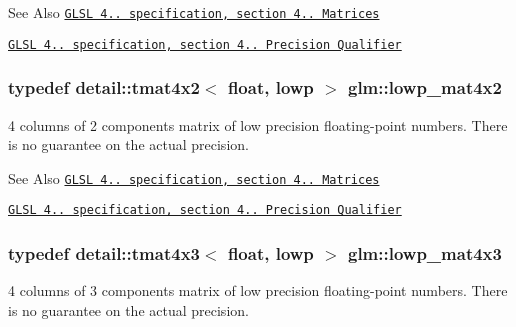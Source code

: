 \begin{DoxySeeAlso}{See Also}
\href{http://www.opengl.org/registry/doc/GLSLangSpec.4.20.8.pdf}{\tt G\-L\-S\-L 4.. specification, section 4.. Matrices} 

\href{http://www.opengl.org/registry/doc/GLSLangSpec.4.20.8.pdf}{\tt G\-L\-S\-L 4.. specification, section 4.. Precision Qualifier} 
\end{DoxySeeAlso}
\hypertarget{group__core__precision_ga2cfe24ae14da17f3510acfc3d03e05a5}{
\subsubsection[{lowp\-\_\-mat4x2}]{\setlength{\rightskip}{0pt plus 5cm}typedef detail\-::tmat4x2$<$ float, lowp $>$ {\bf glm\-::lowp\-\_\-mat4x2}}}\label{group__core__precision_ga2cfe24ae14da17f3510acfc3d03e05a5}
4 columns of 2 components matrix of low precision floating-\/point numbers. There is no guarantee on the actual precision.

\begin{DoxySeeAlso}{See Also}
\href{http://www.opengl.org/registry/doc/GLSLangSpec.4.20.8.pdf}{\tt G\-L\-S\-L 4.. specification, section 4.. Matrices} 

\href{http://www.opengl.org/registry/doc/GLSLangSpec.4.20.8.pdf}{\tt G\-L\-S\-L 4.. specification, section 4.. Precision Qualifier} 
\end{DoxySeeAlso}
\hypertarget{group__core__precision_gada92d0baf15002240dd6f638c57f9fec}{
\subsubsection[{lowp\-\_\-mat4x3}]{\setlength{\rightskip}{0pt plus 5cm}typedef detail\-::tmat4x3$<$ float, lowp $>$ {\bf glm\-::lowp\-\_\-mat4x3}}}\label{group__core__precision_gada92d0baf15002240dd6f638c57f9fec}
4 columns of 3 components matrix of low precision floating-\/point numbers. There is no guarantee on the actual precision.

